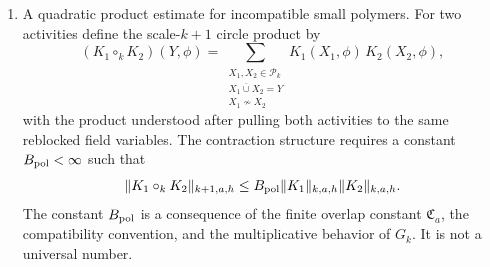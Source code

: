 \begin{definition}
\begin{enumerate}
  complementary projection \(1-\mathcal L_k\) is the irrelevant remainder.
  After fluctuation integration and rescaling, denoted here by
  \(\mathcal A_k\), the contraction structure includes constants
  \(A_{\rm irr}<\infty\) and \(\alpha>0\) such that
  \begin{equation}
    \|(1-\mathcal L_k)\mathcal A_kK_k\|_{k+1,a,h}
    \leq
    A_{\rm irr}L^{-\alpha}\|K_k\|_{k,a,h}.
    \label{eq:rg-polymer-linear-irrelevant-bound}
  \end{equation}
  This is the analytic place where Taylor remainder estimates, covariance
  finite-range bounds, field rescaling, and large-field stability enter.
  \item A quadratic product estimate for incompatible small polymers.  For
  two activities define the scale-\(k+1\) circle product by
  \begin{equation}
    (K_1\circ_k K_2)(Y,\phi)
    =
    \sum_{\substack{X_1,X_2\in\mathcal P_k\\
      \overline{X_1\cup X_2}=Y\\ X_1\not\sim X_2}}
    K_1(X_1,\phi)\,K_2(X_2,\phi),
    \label{eq:rg-polymer-circle-product}
  \end{equation}
  with the product understood after pulling both activities to the same
  reblocked field variables.  The contraction structure requires a constant
  \(B_{\rm pol}<\infty\) such that
  \begin{equation}
    \|K_1\circ_k K_2\|_{k+1,a,h}
    \leq
    B_{\rm pol}\|K_1\|_{k,a,h}\|K_2\|_{k,a,h}.
    \label{eq:rg-polymer-circle-product-bound}
  \end{equation}
  The constant \(B_{\rm pol}\) is a consequence of the finite overlap
  constant \(\mathfrak C_a\), the compatibility convention, and the
  multiplicative behavior of \(G_k\).  It is not a universal number.


\end{enumerate}
\end{definition}
